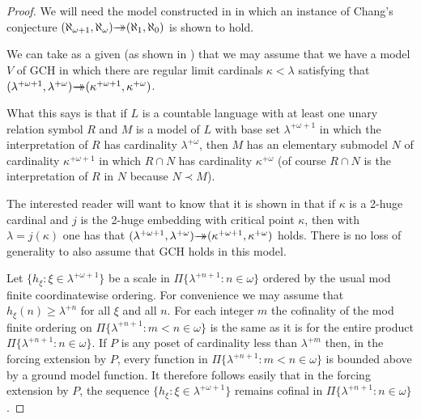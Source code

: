 \documentclass{amsart}
\theoremstyle{plain}
\theoremstyle{definition}
\theoremstyle{remark}
\theoremstyle{plain}
\theoremstyle{definition}
\theoremstyle{remark}
\begin{document}
            \begin{proof}
            We will need the model constructed in \cite{MR1045371} in
             which an instance of Chang's conjecture
             $(\aleph_{\omega+1},\aleph_\omega) \rlap{$\rightarrow$}\,{\rightarrow}
             (\aleph_1,\aleph_0)$ is shown to hold.

            We can take as a given (as shown in \cite[Theorem 5]{MR1045371}) that we may
            assume that we have a model $V$
            of GCH in which there are regular limit cardinals $\kappa<\lambda$
            satisfying that
            $(\lambda^{+\omega+1},\lambda^{+\omega})\rlap{$\rightarrow$}\,{\rightarrow}
            (\kappa^{+\omega+1},\kappa^{+\omega})$.


            What this says is that if $L$ is a countable language
            with at least one unary relation symbol $R$ and
             $M$ is a model of $L$  with base set $\lambda^{+\omega+1}$
            in which the interpretation of $R$ has cardinality
             $\lambda^{+\omega}$, then $M$ has an elementary submodel
             $N$ of cardinality $\kappa^{+\omega+1}$ in which
            $R\cap N$ has cardinality $\kappa^{+\omega}$ (of course
             $R\cap N$ is the interpretation of $R$ in $N$ because
            $N\prec M$).

            The interested reader will want to know that it is shown in
            \cite{MR1045371} that if $\kappa$ is a 2-huge cardinal
            and $j$ is the 2-huge
            embedding with critical point $\kappa$, then with
             $\lambda = j(\kappa)$ one has that
            $(\lambda^{+\omega+1},\lambda^{+\omega})\rlap{$\rightarrow$}\,{\rightarrow}
            (\kappa^{+\omega+1},\kappa^{+\omega})$ holds. There is no loss of
            generality to  also assume that GCH holds in this model.



            Let $\{ h_\xi : \xi \in \lambda^{+\omega+1}\}$
            be a scale in $\Pi\{ \lambda^{+n+1} : n\in \omega\}$
             ordered by the usual mod finite coordinatewise
            ordering. For convenience we may assume that $h_\xi(n) \geq
            \lambda^{+n}$ for all $\xi$ and all $n$. For each integer
             $m$ the cofinality of the mod finite ordering on
             $\Pi\{ \lambda^{+n+1} : m< n\in \omega\}$
            is the same as it is for the entire product
             $\Pi\{ \lambda^{+n+1} : n\in \omega\}$. If $P$
            is any poset of cardinality less than
             $\lambda^{+m}$ then, in the forcing extension by $P$,
            every function in
             $\Pi\{ \lambda^{+n+1} : m< n\in \omega\}$ is bounded
            above by a ground model function.
            It therefore
            follows easily that  in the forcing
            extension by $P$,  the sequence
            $\{ h_\xi : \xi \in \lambda^{+\omega+1}\}$  remains cofinal in
             $\Pi\{ \lambda^{+n+1} : n\in \omega\}$.




\end{proof}
\end{document}
